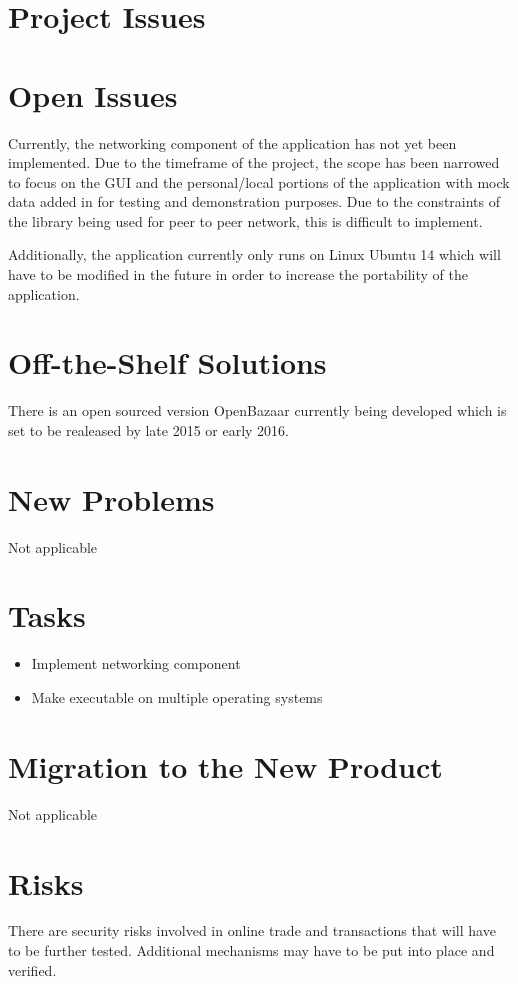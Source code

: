 \documentclass{article}
\begin{document}
\section*{Project Issues}

\section{Open Issues}
Currently, the networking component of the application has not yet been implemented. Due to the timeframe of the project, the scope has been narrowed to focus on the GUI and the personal/local portions of the application with mock data added in for testing and demonstration purposes. Due to the constraints of the library being used for peer to peer network, this is difficult to implement.

Additionally, the application currently only runs on Linux Ubuntu 14 which will have to be modified in the future in order to increase the portability of the application. 

\section{Off-the-Shelf Solutions}
There is an open sourced version OpenBazaar currently being developed which is set to be realeased by late 2015 or early 2016. 

\section{New Problems}
Not applicable

\section{Tasks}
\begin{itemize}
\item
Implement networking component
\item
Make executable on multiple operating systems
\end{itemize}

\section{Migration to the New Product}
Not applicable

\section{Risks}
There are security risks involved in online trade and transactions that will have to be further tested. Additional mechanisms may have to be put into place and verified.
\end{document}
